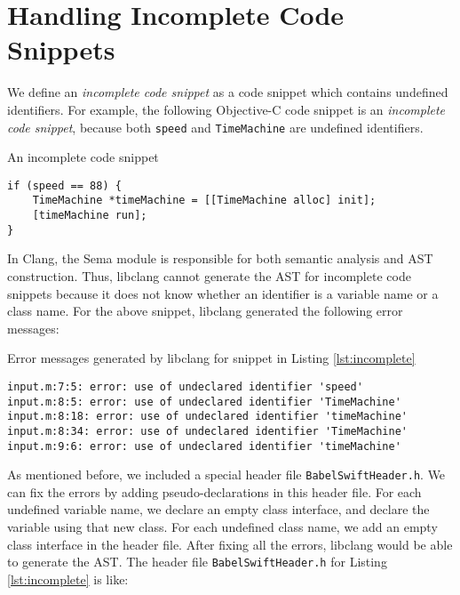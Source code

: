 \documentclass{sfuthesis}
\begin{document}

\section{Handling Incomplete Code Snippets}

We define an \emph{incomplete code snippet} as a code snippet which contains undefined identifiers. For example, the following Objective-C code snippet is an \emph{incomplete code snippet}, because both \texttt{speed} and \texttt{TimeMachine} are undefined identifiers.

\begin{listing}[H]
\caption{An incomplete code snippet}
\label{lst:incomplete}
\begin{verbatim}
if (speed == 88) {
    TimeMachine *timeMachine = [[TimeMachine alloc] init];
    [timeMachine run];
}
\end{verbatim}
\end{listing}

In Clang, the Sema module is responsible for both semantic analysis and AST construction. Thus, libclang cannot generate the AST for incomplete code snippets because it does not know whether an identifier is a variable name or a class name. For the above snippet, libclang generated the following error messages:

\begin{listing}
\caption{Error messages generated by libclang for snippet in Listing \ref{lst:incomplete}}
\begin{verbatim}
input.m:7:5: error: use of undeclared identifier 'speed'
input.m:8:5: error: use of undeclared identifier 'TimeMachine'
input.m:8:18: error: use of undeclared identifier 'timeMachine'
input.m:8:34: error: use of undeclared identifier 'TimeMachine'
input.m:9:6: error: use of undeclared identifier 'timeMachine'
\end{verbatim}
\end{listing}

As mentioned before, we included a special header file \texttt{BabelSwiftHeader.h}. We can fix the errors by adding pseudo-declarations in this header file. For each undefined variable name, we declare an empty class interface, and declare the variable using that new class. For each undefined class name, we add an empty class interface in the header file. After fixing all the errors, libclang would be able to generate the AST. The header file \texttt{BabelSwiftHeader.h} for Listing \ref{lst:incomplete} is like:
\end{document}
